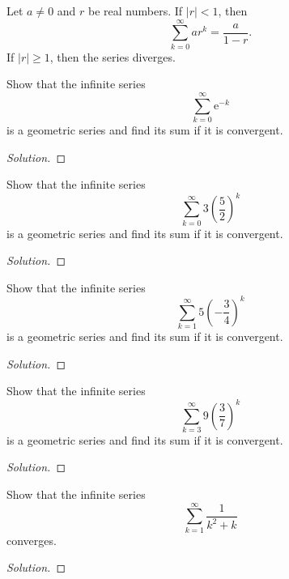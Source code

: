 \documentclass[compacto,10pt,comentarios]{aleph-notas}
\begin{document}
\begin{teo}
    Let $a \neq 0$ and $r$ be real numbers. If $|r| < 1$, then
    $$
        \sum_{k=0}^{\infty} a r^{k} = \frac{a}{1 - r}.
    $$
    If $|r| \geq 1$, then the series diverges.
\end{teo}

\begin{ejer}
    Show that the infinite series
    $$
        \sum_{k=0}^{\infty} \mathrm{e}^{-k}
    $$
    is a geometric series and find its sum if it is convergent.
\end{ejer}
\begin{proof}[Solution]
    
\end{proof}

\begin{ejer}
    Show that the infinite series
    $$
        \sum_{k=0}^{\infty} 3\left(\frac{5}{2}\right)^{k}
    $$
    is a geometric series and find its sum if it is convergent.
\end{ejer}
\begin{proof}[Solution]
    
\end{proof}

\begin{ejer}
    Show that the infinite series
    $$
        \sum_{k=1}^{\infty} 5 \left( - \frac{3}{4} \right)^{k}
    $$
    is a geometric series and find its sum if it is convergent.
\end{ejer}
\begin{proof}[Solution]
    
\end{proof}

\begin{ejer}
    Show that the infinite series
    $$
        \sum_{k=3}^{\infty} 9 \left( \frac{3}{7} \right)^{k}
    $$
    is a geometric series and find its sum if it is convergent.
\end{ejer}
\begin{proof}[Solution]
    
\end{proof}

\begin{ejer}
    Show that the infinite series
    $$
        \sum_{k=1}^{\infty} \frac{1}{k^2+k}
    $$
    converges.
\end{ejer}
\begin{proof}[Solution]
    
\end{proof}
\end{document}
